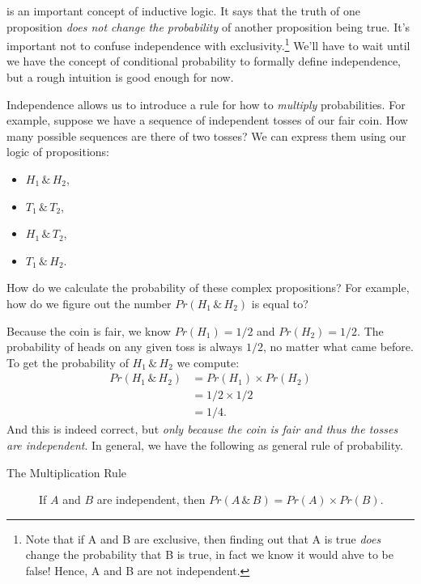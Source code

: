 \documentclass[]{tufte-book}
\providecommand{\tightlist}{%
  \setlength{\itemsep}{0pt}\setlength{\parskip}{0pt}}
\begin{document}
 is an important concept of inductive logic. It says that the truth of one proposition \emph{does not change the probability} of another proposition being true. It's important not to confuse independence with exclusivity.\footnote{Note that if A and B are exclusive, then finding out that A is true \emph{does} change the probability that B is true, in fact we know it would ahve to be false! Hence, A and B are not independent.} We'll have to wait until we have the concept of conditional probability to formally define independence, but a rough intuition is good enough for now.

Independence allows us to introduce a rule for how to \emph{multiply} probabilities. For example, suppose we have a sequence of independent tosses of our fair coin. How many possible sequences are there of two tosses? We can express them using our logic of propositions:

\begin{itemize}
\tightlist
\item
  \(H_1 \,\&\, H_2\),
\item
  \(T_1 \,\&\, T_2\),
\item
  \(H_1 \,\&\, T_2\),
\item
  \(T_1 \,\&\, H_2\).
\end{itemize}

How do we calculate the probability of these complex propositions? For example, how do we figure out the number \(Pr(H_1 \,\&\, H_2)\) is equal to?

Because the coin is fair, we know \(Pr(H_1) = 1/2\) and \(Pr(H_2) = 1/2\). The probability of heads on any given toss is always \(1/2\), no matter what came before. To get the probability of \(H_1 \,\&\, H_2\) we compute:
\[
  \begin{aligned}
    Pr(H_1 \,\&\, H_2) &= Pr(H_1) \times Pr(H_2)\\
                       &= 1/2 \times 1/2\\
                       &= 1/4.
  \end{aligned}
\]
And this is indeed correct, but \emph{only because the coin is fair and thus the tosses are independent}. In general, we have the following as general rule of probability.

\begin{description}
\item[The Multiplication Rule]
If \(A\) and \(B\) are independent, then \(Pr(A \,\&\, B) = Pr(A) \times Pr(B)\).
\end{description}
\end{document}
